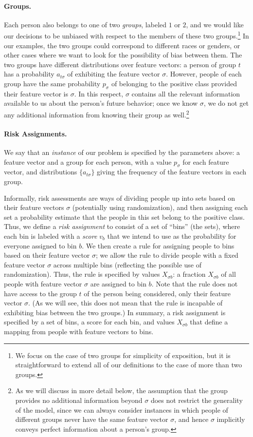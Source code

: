 \documentclass[11pt]{article}
\newcommand{\xhdr}[1]{\vspace{-0.2in} \paragraph*{\bf {#1}.}}
\begin{document}
\xhdr{Groups}
Each person also belongs to one of two {\em groups}, labeled $1$ or $2$,
and we would like our decisions
to be unbiased with respect to the members of these two 
groups.\footnote{We focus on the case of two groups for simplicity
of exposition, but it is straightforward to extend all of our definitions
to the case of more than two groups.}
In our examples, the two groups could correspond to different races
or genders, or other cases where we want to look for the possibility of bias
between them.
The two groups have different distributions over feature vectors:
a person of group $t$ has a probability $a_{t\sigma}$ of exhibiting
the feature vector $\sigma$.
However, people of each group have the same probability $p_\sigma$
of belonging to the positive class provided their feature vector is $\sigma$.
In this respect, $\sigma$ contains all the relevant information available
to us about the person's future behavior; once we know $\sigma$, we do not
get any additional information from knowing their group as 
well.\footnote{As we will discuss in more detail below, 
the assumption that the group provides no additional information beyond
$\sigma$ does not restrict the generality of the model, since 
we can always consider instances in which people of different groups
never have the same feature vector $\sigma$, and hence $\sigma$
implicitly conveys perfect information about a person's group.}

\xhdr{Risk Assignments}
We say that an {\em instance} of our problem is specified by the
parameters above: a feature vector and a group for each person, with
a value $p_\sigma$ for each feature vector, and distributions
$\{a_{t\sigma}\}$ giving the frequency of the feature vectors in each group.

Informally, risk assessments are ways of dividing people up into sets
based on their
feature vectors $\sigma$ (potentially using randomization),
and then assigning each set a probability
estimate that the people in this set belong to the positive class.
Thus, we define a {\em risk assignment} to consist of a set of ``bins''
(the sets), where each bin is labeled with a {\em score} $v_b$ that
we intend to use as the probability for everyone assigned to bin $b$.
We then create a rule for assigning
people to bins based on their feature vector $\sigma$;
we allow the rule to divide people with a fixed feature vector $\sigma$
across multiple bins (reflecting the possible use of randomization).
Thus, the rule is specified by values $X_{\sigma b}$:
a fraction $X_{\sigma b}$ of all people with 
feature vector $\sigma$ are assigned to bin $b$.
Note that the rule does not have access to the group $t$ of the person
being considered, only their feature vector $\sigma$.  
(As we will see, this does not mean that the rule
is incapable of exhibiting bias between the two groups.)
In summary, a risk assignment is specified by a set of bins,
a score for each bin, and values $X_{\sigma b}$ that define a mapping from
people with feature vectors to bins.
\end{document}
